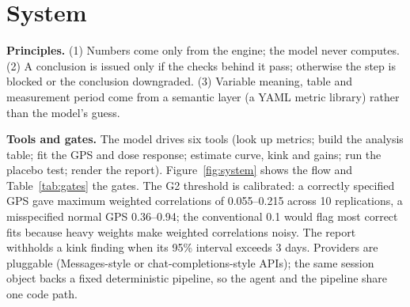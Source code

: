 \documentclass[sigconf,anonymous,review]{acmart}
\begin{document}
\section{System}\label{sec:system}

\textbf{Principles.} (1) Numbers come only from the engine; the model never computes. (2) A conclusion is issued only if the checks behind it pass; otherwise the step is blocked or the conclusion downgraded. (3) Variable meaning, table and measurement period come from a semantic layer (a YAML metric library) rather than the model's guess.

\textbf{Tools and gates.} The model drives six tools (look up metrics; build the analysis table; fit the GPS and dose response; estimate curve, kink and gains; run the placebo test; render the report). Figure~\ref{fig:system} shows the flow and Table~\ref{tab:gates} the gates. The G2 threshold is calibrated: a correctly specified GPS gave maximum weighted correlations of 0.055--0.215 across 10 replications, a misspecified normal GPS 0.36--0.94; the conventional 0.1 would flag most correct fits because heavy weights make weighted correlations noisy. The report withholds a kink finding when its 95\% interval exceeds 3 days. Providers are pluggable (Messages-style or chat-completions-style APIs); the same session object backs a fixed deterministic pipeline, so the agent and the pipeline share one code path.
\end{document}
